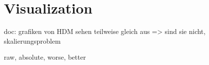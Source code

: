 \section{Visualization}

doc: grafiken von HDM sehen teilweise gleich aus => sind sie nicht, skalierungsproblem


raw, absolute, worse, better